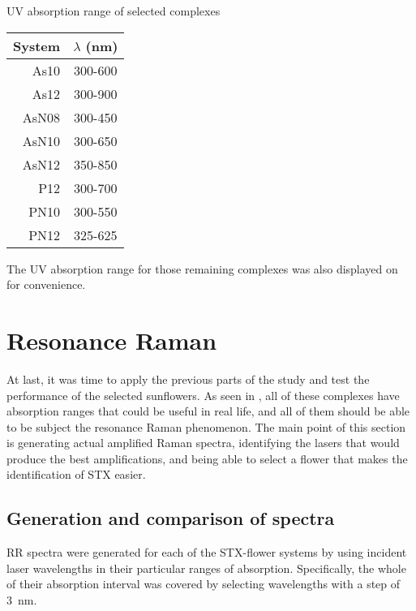 \begin{margintable}
    \centering
    \caption[UV absorption range of selected complexes]{UV absorption range of selected complexes}
    \begin{tabular}{@{}rc@{}}
        \toprule
        System & $\lambda$ (\si{\nano\metre}) \\
        \midrule
        As10 & 300-600 \\
        As12 & 300-900 \\
        AsN08 & 300-450 \\
        AsN10 & 300-650 \\
        AsN12 & 350-850 \\
        P12 & 300-700 \\
        PN10 & 300-550 \\
        PN12 & 325-625 \\
    \end{tabular}
\end{margintable}

The UV absorption range for those remaining complexes was also displayed on  for convenience.

\section{Resonance Raman}
At last, it was time to apply the previous parts of the study and test the performance of the selected sunflowers.
As seen in , all of these complexes have absorption ranges that could be useful in real life, and all of them should be able to be subject the resonance Raman phenomenon.
The main point of this section is generating actual amplified Raman spectra, identifying the lasers that would produce the best amplifications, and being able to select a flower that makes the identification of STX easier.

\subsection{Generation and comparison of spectra}
RR spectra were generated for each of the STX-flower systems by using incident laser wavelengths in their particular ranges of absorption.
Specifically, the whole of their absorption interval was covered by selecting wavelengths with a step of \SI{3}{\nano\metre}.

